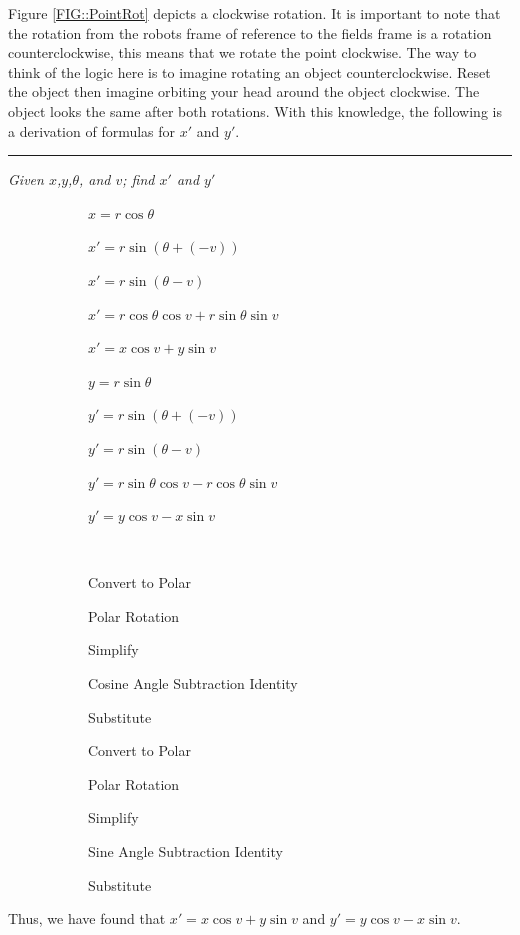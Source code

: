 \documentclass[12pt]{report}
\newcommand{\rulesep}{\unskip\ \vrule\ }
\begin{document}
Figure \ref{FIG::PointRot} depicts a clockwise rotation. It is important to note that the rotation from the
robots frame of reference to the fields frame is a rotation counterclockwise, this means that we
rotate the point clockwise. The way to think of the logic here is to imagine rotating an object
counterclockwise. Reset the object then imagine orbiting your head around the object clockwise.
The object looks the same after both rotations. 
With this knowledge, the following is a derivation of formulas for $x'$ and $y'$.

\centering
\hrule
\textit{Given $x$,$y$,$\theta$, and $v$; find $x'$ and $y'$}

\begin{figure}[h]
    \begin{subfigure}{0.5\textwidth}
        \centering
        $x=r\cos\theta$

        $x'=r\sin(\theta+(-v))$

        $x'=r\sin(\theta-v)$

        $x'=r\cos\theta\cos v + r\sin\theta\sin v$

        $x'=x\cos v + y\sin v$

        $y=r\sin\theta$

        $y'=r\sin(\theta+(-v))$

        $y'=r\sin(\theta-v)$

        $y'=r\sin\theta\cos v - r\cos\theta\sin v$

        $y'=y\cos v - x\sin v$
    \end{subfigure}%
    \rulesep
    \begin{subfigure}{0.5\textwidth}
        \centering
        Convert to Polar

        Polar Rotation

        Simplify

        Cosine Angle Subtraction Identity

        Substitute

        Convert to Polar

        Polar Rotation

        Simplify

        Sine Angle Subtraction Identity

        Substitute

    \end{subfigure}
\end{figure}

\raggedright
Thus, we have found that $x' = x\cos v + y\sin v$ and $y'=y\cos v - x\sin v$.
\end{document}
